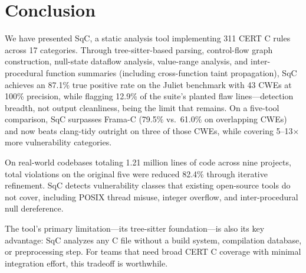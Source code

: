 \section{Conclusion}
\label{sec:conclusion}

We have presented SqC, a static analysis tool implementing 311 CERT C
rules across 17 categories.  Through tree-sitter-based parsing,
control-flow graph construction, null-state dataflow analysis,
value-range analysis, and inter-procedural function summaries
(including cross-function taint propagation), SqC achieves an 87.1\%
true positive rate on the Juliet benchmark with 43 CWEs at 100\%
precision, while flagging 12.9\% of the suite's planted flaw
lines---detection breadth, not output cleanliness, being the limit
that remains.  On a five-tool comparison, SqC surpasses Frama-C
(79.5\% vs.\ 61.0\% on overlapping CWEs) and now beats clang-tidy
outright on three of those CWEs, while covering 5--13$\times$
more vulnerability categories.

On real-world codebases totaling 1.21 million lines of code across
nine projects, total violations on the original five were reduced
82.4\% through iterative refinement.  SqC detects vulnerability
classes that existing open-source tools do not cover, including
POSIX thread misuse, integer overflow, and inter-procedural null
dereference.

The tool's primary limitation---its tree-sitter foundation---is also
its key advantage: SqC analyzes any C file without a build system,
compilation database, or preprocessing step.  For teams that need
broad CERT C coverage with minimal integration effort, this tradeoff
is worthwhile.

